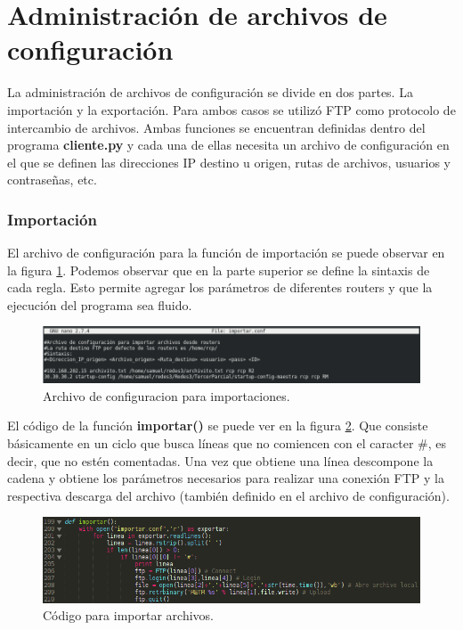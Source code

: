 \section{Administración de archivos de configuración}
La administración de archivos de configuración se divide en dos partes. La importación y la exportación. Para ambos casos se utilizó FTP como protocolo de intercambio de archivos. Ambas funciones se encuentran definidas dentro del programa \textbf{cliente.py} y cada una de ellas necesita un archivo de configuración en el que se definen las direcciones IP destino u origen, rutas de archivos, usuarios y contraseñas, etc.

\subsubsection{Importación}
El archivo de configuración para la función de importación se puede observar en la figura \ref{image:import-conf}. Podemos observar que en la parte superior se define la sintaxis de cada regla. Esto permite agregar los parámetros de diferentes routers y que la ejecución del programa sea fluido.

\FloatBarrier
\begin{figure}[htbp!]
		\centering
			\includegraphics[width=1 \textwidth]{images/import-conf}
		\caption{Archivo de configuracion para importaciones.}
		\label{image:import-conf}
\end{figure}
\FloatBarrier

El código de la función \textbf{importar()} se puede ver en la figura \ref{image:import-codigo}. Que consiste básicamente en un ciclo que busca líneas que no comiencen con el caracter \#, es decir, que no estén comentadas. Una vez que obtiene una línea descompone la cadena y obtiene los parámetros necesarios para realizar una conexión FTP y la respectiva descarga del archivo (también definido en el archivo de configuración). 

\FloatBarrier
\begin{figure}[htbp!]
		\centering
			\includegraphics[width=.8 \textwidth]{images/import-codigo}
		\caption{Código para importar archivos.}
		\label{image:import-codigo}
\end{figure}
\FloatBarrier

